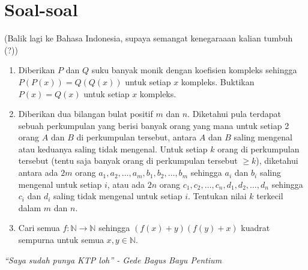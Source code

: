 \documentclass{article}
\begin{document}
	\section{Soal-soal}
	(Balik lagi ke Bahasa Indonesia, supaya semangat kenegaraaan kalian tumbuh (?))
	\vspace{1em}
	\begin{enumerate}
		\item Diberikan $P$ dan $Q$ suku banyak monik dengan koefisien kompleks sehingga $P(P(x)) = Q(Q(x))$ untuk setiap $x$ kompleks. Buktikan $P(x) = Q(x)$ untuk setiap $x$ kompleks.
		\item Diberikan dua bilangan bulat positif $m$ dan $n$. Diketahui pula terdapat sebuah perkumpulan yang berisi banyak orang yang mana untuk setiap 2 orang $A$ dan $B$ di perkumpulan tersebut, antara $A$ dan $B$ saling mengenal atau keduanya saling tidak mengenal. Untuk setiap $k$ orang di perkumpulan tersebut (tentu saja banyak orang di perkumpulan tersebut $\ge k$), diketahui antara ada $2m$ orang $a_1, a_2, \dotsc, a_m, b_1, b_2, \dotsc, b_m$ sehingga $a_i$ dan $b_i$ saling mengenal untuk setiap $i$, atau ada $2n$ orang $c_1, c_2, \dotsc, c_n, d_1, d_2, \dotsc, d_n$ sehingga $c_i$ dan $d_i$ saling tidak mengenal untuk setiap $i$. Tentukan nilai $k$ terkecil dalam $m$ dan $n$.
		\item Cari semua $f: \mathbb{N} \to \mathbb{N}$ sehingga $(f(x) + y)(f(y) + x)$ kuadrat sempurna untuk semua $x, y \in \mathbb{N}$.
	\end{enumerate}
	\begin{center}
		\textit{``Saya sudah punya KTP loh'' - Gede Bagus Bayu Pentium}
	\end{center}
\end{document}
